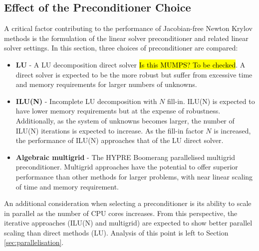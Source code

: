 \documentclass[sn-mathphys,Numbered]{sn-jnl}%
\begin{document}
\subsection{Effect of the Preconditioner Choice}
A critical factor contributing to the performance of Jacobian-free Newton Krylov methods is the formulation of the linear solver preconditioner and related linear solver settings.
In this section, three choices of preconditioner are compared:
\begin{itemize}
	\item \textbf{LU} - A LU decomposition direct solver \hl{Is this MUMPS? To be checked}. A direct solver is expected to be the more robust but suffer from excessive time and memory requirements for larger numbers of unknowns.
	\item \textbf{ILU(N)} - Incomplete LU decomposition with $N$ fill-in. ILU(N) is expected to have lower memory requirements but at the expense of robustness. Additionally, as the system of unknowns becomes larger, the number of ILU(N) iterations is expected to increase. As the fill-in factor $N$ is increased, the performance of ILU(N) approaches that of the LU direct solver.
	\item \textbf{Algebraic multigrid} - The HYPRE Boomerang parallelised multigrid preconditioner. Multigrid approaches have the potential to offer superior performance than other methods for larger problems, with near linear scaling of time and memory requirement.
\end{itemize}

An additional consideration when selecting a preconditioner is its ability to scale in parallel as the number of CPU cores increases.
From this perspective, the iterative approaches (ILU(N) and multigrid) are expected to show better parallel scaling than direct methods (LU).
Analysis of this point is left to Section \ref{sec:parallelisation}.
\end{document}
